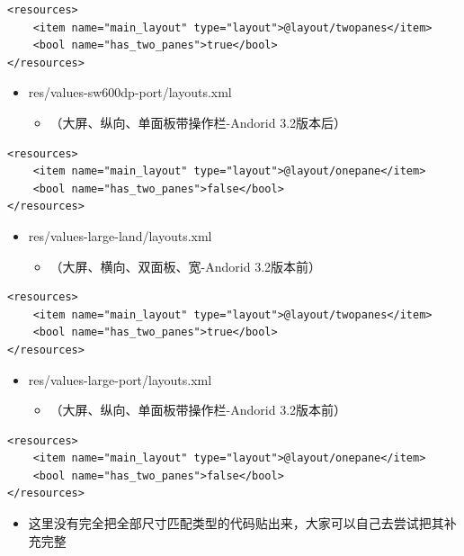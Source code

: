\documentclass[9pt, b5paper]{article}
\begin{document}
\begin{enumerate}
\begin{enumerate}
\begin{enumerate}
\begin{itemize}
\begin{verbatim}
<resources>
    <item name="main_layout" type="layout">@layout/twopanes</item>
    <bool name="has_two_panes">true</bool>
</resources>
\end{verbatim}
\begin{itemize}
\item res/values-sw600dp-port/layouts.xml
\begin{itemize}
\item （大屏、纵向、单面板带操作栏-Andorid 3.2版本后）
\end{itemize}
\end{itemize}
\begin{verbatim}
<resources>
    <item name="main_layout" type="layout">@layout/onepane</item>
    <bool name="has_two_panes">false</bool>
</resources>
\end{verbatim}
\begin{itemize}
\item res/values-large-land/layouts.xml
\begin{itemize}
\item （大屏、横向、双面板、宽-Andorid 3.2版本前）
\end{itemize}
\end{itemize}
\begin{verbatim}
<resources>
    <item name="main_layout" type="layout">@layout/twopanes</item>
    <bool name="has_two_panes">true</bool>
</resources>
\end{verbatim}
\begin{itemize}
\item res/values-large-port/layouts.xml
\begin{itemize}
\item （大屏、纵向、单面板带操作栏-Andorid 3.2版本前）
\end{itemize}
\end{itemize}
\begin{verbatim}
<resources>
    <item name="main_layout" type="layout">@layout/onepane</item>
    <bool name="has_two_panes">false</bool>
</resources>
\end{verbatim}
\begin{itemize}
\item 这里没有完全把全部尺寸匹配类型的代码贴出来，大家可以自己去尝试把其补充完整
\end{itemize}
\end{itemize}
\end{enumerate}
\end{enumerate}


\end{enumerate}
\end{document}
